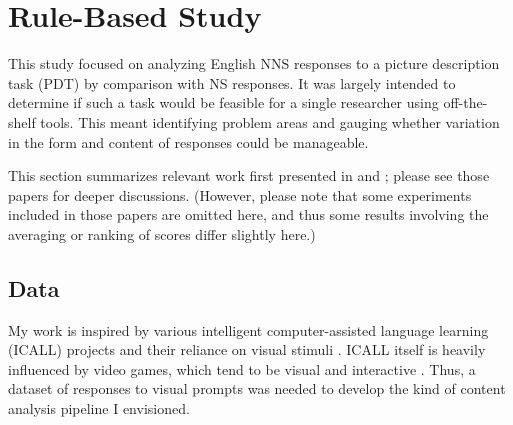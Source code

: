 
\section{Rule-Based Study}
\label{sec:pilot-study}
This study focused on analyzing English NNS responses to a picture description task (PDT) by comparison with NS responses. It was largely intended to determine if such a task would be feasible for a single researcher using off-the-shelf tools. This meant identifying problem areas and gauging whether variation in the form and content of responses could be manageable.

This section summarizes relevant work first presented in \citet{king:dickinson:13} and \citet{king:dickinson:14}; please see those papers for deeper discussions. (However, please note that some experiments included in those papers are omitted here, and thus some results involving the averaging or ranking of scores differ slightly here.)

\subsection{Data}
\label{sec:pilot-data}
My work is inspired by various intelligent computer-assisted language learning (ICALL) projects and their reliance on visual stimuli \citep{nagata:02, granstrom2004, yamazaki2014}. ICALL itself is heavily influenced by video games, which tend to be visual and interactive \citep{collentine2011}. Thus, a dataset of responses to visual prompts was needed to develop the kind of content analysis pipeline I envisioned.

